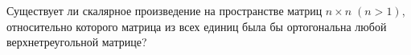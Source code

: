 \documentclass{article}
\begin{document}
Существует ли скалярное произведение на пространстве матриц $n\times n\; (n>1)$, относительно которого матрица из всех
единиц была бы ортогональна любой верхнетреугольной матрице?
\end{document}
